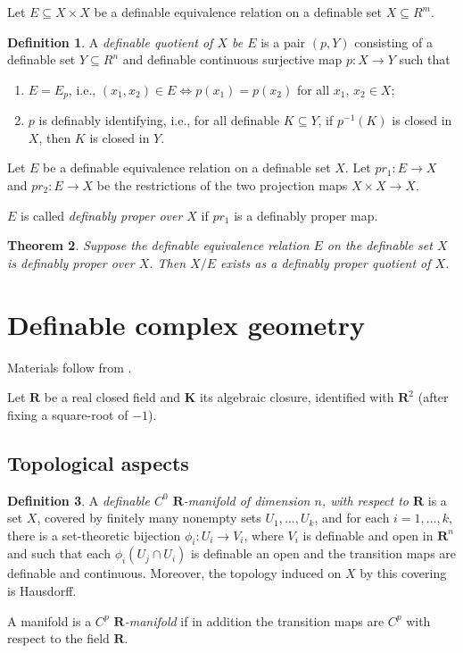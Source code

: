 \documentclass{amsart}
\newtheorem{theorem}{Theorem}[subsection]
\theoremstyle{definition}
\newtheorem{definition}[theorem]{Definition}
\numberwithin{equation}{section}
\begin{document}
Let $E \subseteq X\times X$ be a definable equivalence relation on a definable set $X \subseteq R^m$.

\begin{definition}
  A \emph{definable quotient of $X$ be $E$} is a pair $(p,Y)$ consisting of a definable set $Y \subseteq R^n$ and definable continuous surjective map $p: X\to Y$ such that
  \begin{enumerate}[label = {(\roman*)}]
    \item $E = E_p$, i.e., $(x_1,x_2) \in E \iff p(x_1) = p(x_2)$ for all $x_1$, $x_2 \in X$;
    \item $p$ is definably identifying, i.e., for all definable $K \subseteq Y$, if $p^{-1}(K)$ is closed in $X$, then $K$ is closed in $Y$.
  \end{enumerate}
\end{definition}

Let $E$ be a definable equivalence relation on a definable set $X$.
Let $pr_1 : E \to X$ and $pr_2 : E \to X$ be the restrictions of the two projection maps $X\times X \to X$.

$E$ is called \emph{definably proper over $X$} if $pr_1$ is a definably proper map.

\begin{theorem}
  Suppose the definable equivalence relation $E$ on the definable set $X$ is definably proper over $X$.
  Then $X/E$ exists as a definably proper quotient of $X$.
\end{theorem}

\section{Definable complex geometry}
Materials follow from \cite{MR2441378}.

Let $\mathbf{R}$ be a real closed field and $\mathbf{K}$ its algebraic closure,
identified with $\mathbf{R}^2$ (after fixing a square-root of $-1$).

\subsection{Topological aspects}

\begin{definition}
  A \emph{definable $C^0$ $\mathbf{R}$-manifold of dimension $n$, with respect to $\mathbf{R}$} is a set $X$,
  covered by finitely many nonempty sets $U_1, \dots, U_k$,
  and for each $i = 1, \dots, k$,
  there is a set-theoretic bijection $\phi_i:U_i \to V_i$,
  where $V_i$ is definable and open in $\mathbf{R}^n$ and such that each $\phi_i(U_j\cap U_i)$ is definable an open
  and the transition maps are definable and continuous.
  Moreover, the topology induced on $X$ by this covering is Hausdorff.

  A manifold is a \emph{$C^p$ $\mathbf{R}$-manifold} if in addition
  the transition maps are $C^p$ with respect to the field $\mathbf{R}$.
\end{definition}
\end{document}
